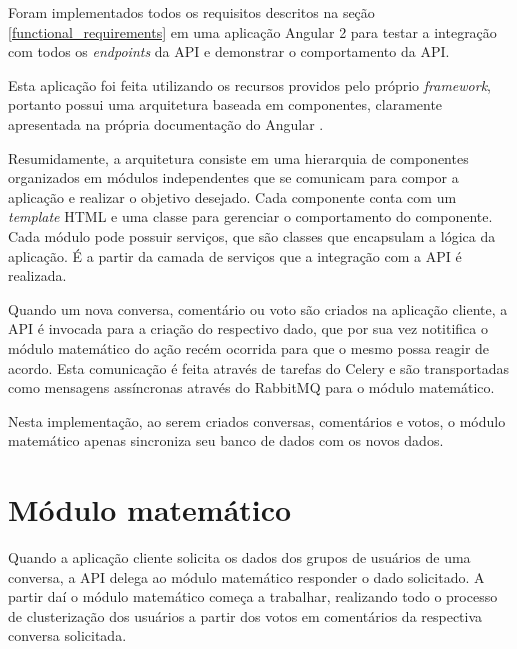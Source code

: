     Foram implementados todos os requisitos descritos na seção \ref{functional_requirements}
    em uma aplicação Angular 2 \footnotemark para
    testar a integração com todos os \textit{endpoints} da API e demonstrar o comportamento da API.
    
    Esta aplicação foi feita utilizando os recursos providos pelo próprio \textit{framework}, portanto
    possui uma arquitetura baseada em componentes, claramente apresentada na própria documentação do Angular \footnotemark.
    
    Resumidamente, a arquitetura consiste em uma hierarquia de componentes organizados
    em módulos independentes que se comunicam para compor a aplicação e realizar o objetivo desejado.
    Cada componente conta com um \textit{template} HTML e uma classe para gerenciar o comportamento do componente.
    Cada módulo pode possuir serviços, que são classes que encapsulam a lógica da aplicação.
    É a partir da camada de serviços que a integração com a API é realizada.
    
    Quando um nova conversa, comentário ou voto são criados na aplicação cliente,
    a API é invocada para a criação do respectivo dado, que por sua vez
    notitifica o módulo matemático do ação recém ocorrida para que o mesmo possa reagir de acordo.
    Esta comunicação é feita através de tarefas do Celery e são transportadas como mensagens assíncronas
    através do RabbitMQ para o módulo matemático.
    
    Nesta implementação, ao serem criados conversas, comentários e votos, o módulo matemático apenas
    sincroniza seu banco de dados com os novos dados.
  
  \section{Módulo matemático}
  
    
    Quando a aplicação cliente solicita os dados dos grupos de usuários de uma conversa,
    a API delega ao módulo matemático responder o dado solicitado. A partir daí o módulo
    matemático começa a trabalhar, realizando todo o processo de clusterização dos usuários
    a partir dos votos em comentários da respectiva conversa solicitada.
    
